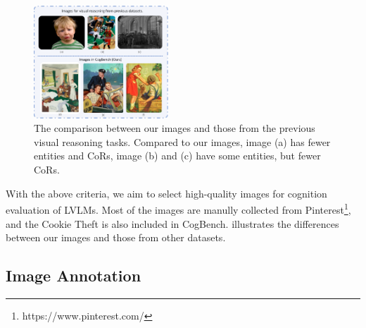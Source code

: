 \begin{figure}[th]
  \centering
  \includegraphics[width=0.45\textwidth]{figs/cog_img_example.pdf}
  \caption{The comparison between our images and those from the previous visual reasoning tasks.
  Compared to our images, image (a) has fewer entities and CoRs, image (b) and (c) have some entities, but fewer CoRs.
}
  \label{fig:cogbench_example}
\end{figure}



With the above criteria, we aim to select high-quality images for cognition evaluation of LVLMs. 
Most of the images are manully collected from Pinterest\footnote{https://www.pinterest.com/}, and the Cookie Theft is also included in CogBench.
 illustrates the differences between our images and those from other datasets.

\subsection{Image Annotation}
\label{sec:annotation}


